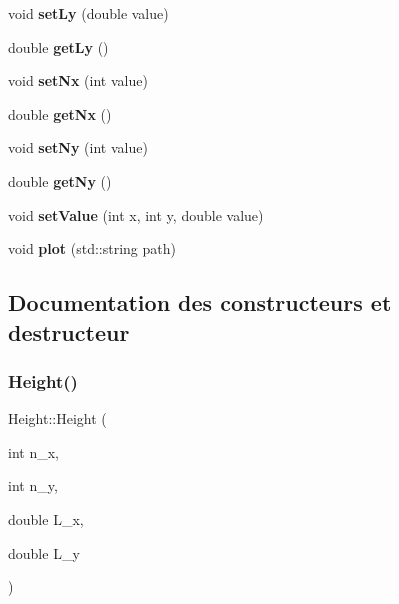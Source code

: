 \begin{DoxyCompactItemize}
\mbox{\label{class_height_a2b324a15c13bcdaebea700937285becd}} 
void {\bfseries set\+Ly} (double value)
\item 
\mbox{\label{class_height_a837ec9f1c378eee4222c56045e5d1bfe}} 
double {\bfseries get\+Ly} ()
\item 
\mbox{\label{class_height_ad2be1933f92071caeb1d743239244fc4}} 
void {\bfseries set\+Nx} (int value)
\item 
\mbox{\label{class_height_a3ff565c348e61bef5d2e22163666d6ca}} 
double {\bfseries get\+Nx} ()
\item 
\mbox{\label{class_height_ab3bacc10cd3ae023dcc54c71f2f803fe}} 
void {\bfseries set\+Ny} (int value)
\item 
\mbox{\label{class_height_a3136f6b29a3318c8e8e160cd077e0f88}} 
double {\bfseries get\+Ny} ()
\item 
\mbox{\label{class_height_aff97482f65f6e17879620854a364151a}} 
void {\bfseries set\+Value} (int x, int y, double value)
\item 
\mbox{\label{class_height_a5d6efd53512f0771e157d36da0b41704}} 
void {\bfseries plot} (std\+::string path)
\end{DoxyCompactItemize}


\subsection{Documentation des constructeurs et destructeur}
\mbox{\label{class_height_af4c985463352fc7f3dd6b00574ef865b}} 
\subsubsection{\texorpdfstring{Height()}{Height()}}
{\footnotesize\ttfamily Height\+::\+Height (\begin{DoxyParamCaption}\item[{int}]{n\+\_\+x,  }\item[{int}]{n\+\_\+y,  }\item[{double}]{L\+\_\+x,  }\item[{double}]{L\+\_\+y }\end{DoxyParamCaption})}



